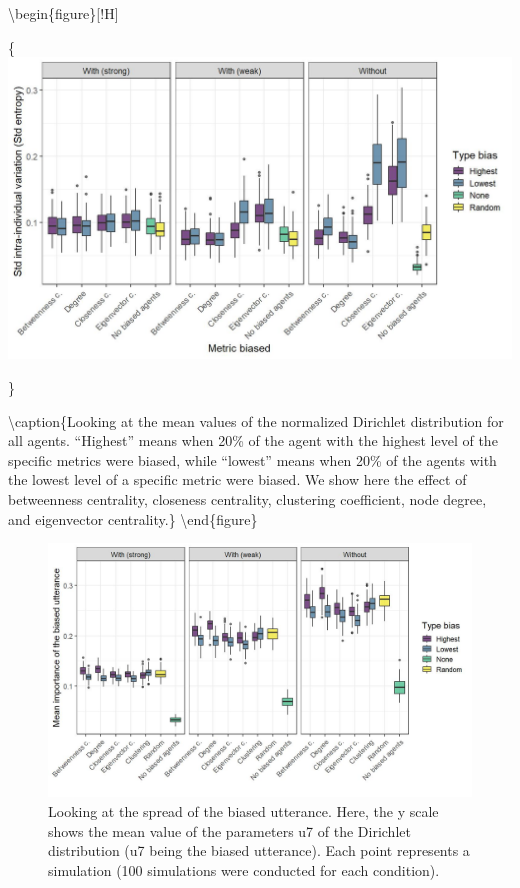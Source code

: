 \documentclass[
]{article}
\begin{document}
\textbackslash begin\{figure\}{[}!H{]}

\{\centering \includegraphics{./Figures/unnamed-chunk-211-1}

\}

\textbackslash caption\{Looking at the mean values of the normalized
Dirichlet distribution for all agents. ``Highest'' means when 20\% of
the agent with the highest level of the specific metrics were biased,
while ``lowest'' means when 20\% of the agents with the lowest level of
a specific metric were biased. We show here the effect of betweenness
centrality, closeness centrality, clustering coefficient, node degree,
and eigenvector centrality.\}\label{fig:unnamed-chunk-211}
\textbackslash end\{figure\}

\begin{figure}[!H]

{\centering \includegraphics{./Figures/unnamed-chunk-212-1} 

}

\caption{Looking at the spread of the biased utterance. Here, the y scale shows the mean value of the parameters u7 of the Dirichlet distribution (u7 being the biased utterance). Each point represents a simulation (100 simulations were conducted for each condition). }\label{fig:unnamed-chunk-212}
\end{figure}
\end{document}
